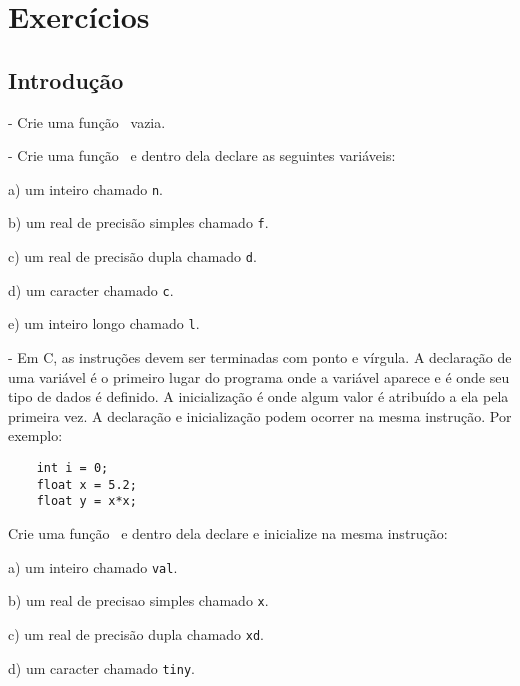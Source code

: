 
\chapter{Exercícios}

\setcounter{iQuest}{0}

\newcommand{\quest}{%
\addtocounter{iQuest}{1}%
\arabic{iQuest}}

\newcommand{\zeraquest}{%
\setcounter{iQuest}{0}}



\zeraquest

\section{Introdução}

\quest - Crie uma função \MAIN\ vazia.

\NEWLINE
\quest - Crie uma função \MAIN\ e dentro dela declare as seguintes variáveis:

	a) um inteiro chamado {\tt n}.

	b) um real de precisão simples chamado {\tt f}.

	c) um real de precisão dupla chamado {\tt d}.

	d) um caracter chamado {\tt c}.

	e) um inteiro longo chamado {\tt l}.

\NEWLINE
\quest - Em C, as instruções devem ser terminadas com ponto e vírgula. A declaração de uma variável é o primeiro lugar do programa onde a variável aparece e é onde seu tipo de dados é definido. A inicialização é onde algum valor é atribuído a ela pela primeira vez. A declaração e inicialização podem ocorrer na mesma instrução. Por exemplo:
\begin{lstlisting}
	int i = 0;
	float x = 5.2;
	float y = x*x;
\end{lstlisting}
Crie uma função \MAIN\ e dentro dela declare e inicialize na mesma instrução:

	a) um inteiro chamado {\tt val}.

	b) um real de precisao simples chamado {\tt x}.

	c) um real de precisão dupla chamado {\tt xd}.

	d) um caracter chamado {\tt tiny}.

